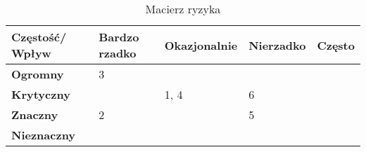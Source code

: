 \documentclass[a4paper,12pt]{article}
\begin{document}
\begin{table}[H]
\centering
\begin{tabular}{| p{2.5cm} | p{2.5cm} | p{2.5cm} | p{2.5cm} | p{2.5cm} |}
\hline \bf Częstość/ Wpływ & \bf Bardzo rzadko & \bf Okazjonalnie & \bf Nierzadko & \bf Często\\ [10pt]

\hline \bf Ogromny & \cellcolor{yellow!50} 3 & \cellcolor{red!50} & \cellcolor{red!50} &\cellcolor{red!50} \\ [10pt]

\hline \bf Krytyczny & \cellcolor{yellow!50} & \cellcolor{yellow!50} 1, 4 & \cellcolor{red!50} 6 &\cellcolor{red!50} \\ [10pt]

\hline \bf Znaczny & \cellcolor{green!50} 2 & \cellcolor{yellow!50} &\cellcolor{yellow!50} 5 & \cellcolor{red!50} \\ [10pt]

\hline \bf Nieznaczny & \cellcolor{green!50} & \cellcolor{green!50} &\cellcolor{yellow!50} &\cellcolor{yellow!50} \\ [10pt]
\hline
\end{tabular} \\
\caption{Macierz ryzyka}
\end{table}
\end{document}
